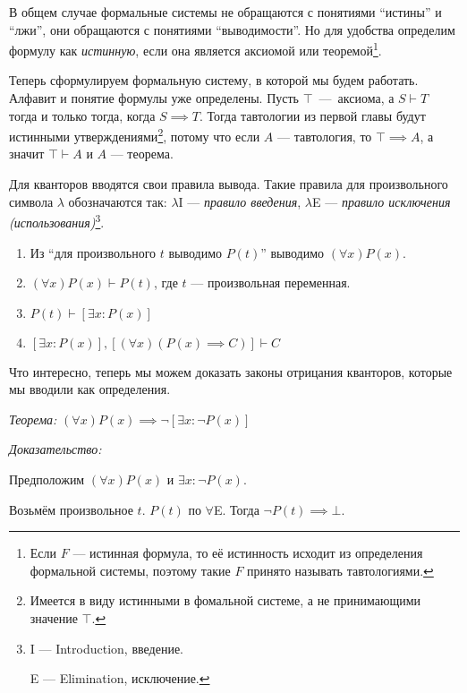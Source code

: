 В общем случае формальные системы не обращаются с понятиями ``истины'' и ``лжи'',
они обращаются с понятиями ``выводимости''. Но для удобства определим формулу
как {\it истинную}, если она является аксиомой или теоремой\footnote{
	Если $F$ --- истинная формула, то её истинность исходит из
	определения формальной системы, поэтому такие $F$ принято называть тавтологиями.
}.

Теперь сформулируем формальную систему, в которой мы будем работать.
Алфавит и понятие формулы уже определены. Пусть $\top$~---~аксиома,
а $S\vdash T$ тогда и только тогда, когда ${S\implies T}$.
Тогда тавтологии из первой главы будут истинными
утверждениями\footnote{Имеется в виду истинными в фомальной системе,
	а не принимающими значение $\top$.}, потому что если $A$ --- тавтология,
то ${\top\implies A}$, а значит $\top\vdash A$ и $A$ --- теорема.

\pagebreak

Для кванторов вводятся свои правила вывода. Такие правила для произвольного
символа $\lambda$ обозначаются так: $\lambda$I --- {\it правило
введения}, $\lambda$E --- {\it правило исключения (использования)}\footnote{
	I --- Introduction, введение.

	E --- Elimination, исключение.
}.

\newcommand\Aii{$\forall$I}
\newcommand\Aee{$\forall$E}
\newcommand\Eii{$\exists$I}
\newcommand\Eee{$\exists$E}
\begin{enumerate}
	\item[(\Aii)]{}Из ``для произвольного $t$ выводимо $P(t)$''
	выводимо $(\forall x)P(x)$.
	\item[(\Aee)]{}$(\forall x)P(x)\vdash P(t)$, где $t$ --- произвольная переменная.
	\item[(\Eii)]{}$P(t)\vdash [\exists x:P(x)]$
	\item[(\Eee)]{}$[\exists x:P(x)], [(\forall x)(P(x)\implies C)]\vdash C$
\end{enumerate}

Что интересно, теперь мы можем доказать законы отрицания кванторов,
которые мы вводили как определения.

\label{wordproof}
{\it Теорема:}
$(\forall x)P(x)\implies \lnot[\exists x:\lnot P(x)]$

{\it Доказательство:}

Предположим $(\forall x)P(x)$ и $\exists x:\lnot P(x)$.

Возьмём произвольное $t$. $P(t)$ по \Aee. Тогда $\lnot P(t)\implies\bot$.

